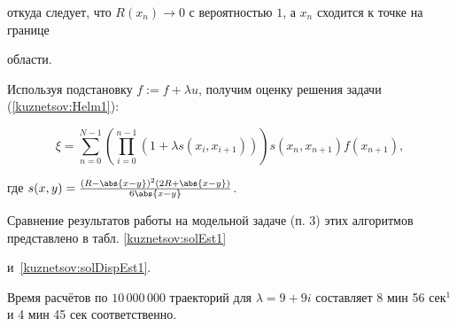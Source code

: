 откуда следует,  что $R(x_n)\to0$ с вероятностью $1$,  а $x_n$ сходится к точке на границе

области.



    Используя подстановку $f:=f+\lambda u$,  получим оценку решения задачи (\ref{kuznetsov:Helm1}):

    \begin{equation}

        \xi=\sum_{n=0}^{N-1}\left(\prod_{i=0}^{n-1}(1+\lambda s(x_i,  x_{i+1}))\right)s(x_n,  x_{n+1})f(x_{n+1}), \label{kuznetsov:walkOnBalls2}

    \end{equation}

    где $s(x,  y)=\frac{(R-\abs{x-y})^2(2R+\abs{x-y})}{6\abs{x-y}}$.



    Сравнение результатов работы на модельной задаче (п. 3) этих алгоритмов представлено в табл. \ref{kuznetsov:solEst1}

и~\ref{kuznetsov:solDispEst1}.

Время расчётов по $10\, 000\, 000$ траекторий для $\lambda=9+9i$ составляет 8 мин 56 сек$^1$ и 4 мин 45 сек соответственно.

